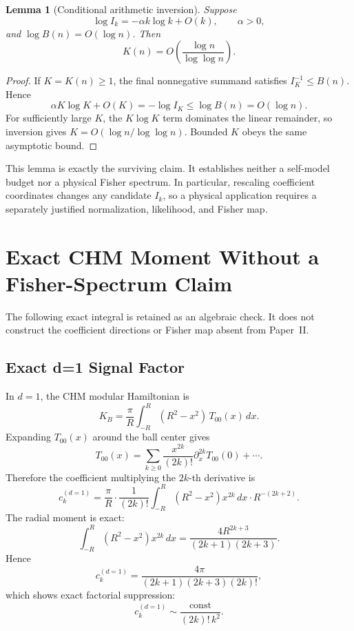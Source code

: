\documentclass[12pt]{article}
\newtheorem{lemma}[theorem]{Lemma}
\theoremstyle{definition}
\theoremstyle{remark}
\begin{document}
\begin{lemma}[Conditional arithmetic inversion]\label{lem:arithmetic-asymptotic}
Suppose
\[
\log I_k=-\alpha k\log k+O(k),
\qquad \alpha>0,
\]
and \(\log B(n)=O(\log n)\). Then
\[
K(n)=O\!\left(\frac{\log n}{\log\log n}\right).
\]
\end{lemma}

\begin{proof}
If \(K=K(n)\ge1\), the final nonnegative summand satisfies
\(I_K^{-1}\le B(n)\). Hence
\[
\alpha K\log K+O(K)=-\log I_K\le\log B(n)=O(\log n).
\]
For sufficiently large \(K\), the \(K\log K\) term dominates the
linear remainder, so inversion gives
\(K=O(\log n/\log\log n)\). Bounded \(K\) obeys the same asymptotic
bound.
\end{proof}

This lemma is exactly the surviving claim. It establishes neither a
self-model budget nor a physical Fisher spectrum. In particular,
rescaling coefficient coordinates changes any candidate \(I_k\), so a
physical application requires a separately justified normalization,
likelihood, and Fisher map.

\section{Exact CHM Moment Without a Fisher-Spectrum Claim}
\label{sec:5}

The following exact integral is retained as an algebraic check. It does
not construct the coefficient directions or Fisher map absent from
Paper~II.

\subsection{Exact d=1 Signal Factor}\label{subsec:5.2}

In \(d=1\), the CHM modular Hamiltonian is
\[
K_B
=
\frac{\pi}{R}\int_{-R}^{R}(R^2-x^2)\,T_{00}(x)\,dx.
\]
Expanding \(T_{00}(x)\) around the ball center gives
\[
T_{00}(x)
=
\sum_{k\ge 0}\frac{x^{2k}}{(2k)!}\partial_x^{2k}T_{00}(0)+\cdots.
\]
Therefore the coefficient multiplying the \(2k\)-th derivative is
\[
c_k^{(d=1)}
=
\frac{\pi}{R}\cdot\frac{1}{(2k)!}
\int_{-R}^{R}(R^2-x^2)x^{2k}\,dx\cdot R^{-(2k+2)}.
\]
The radial moment is exact:
\[
\int_{-R}^{R}(R^2-x^2)x^{2k}\,dx
=
\frac{4R^{2k+3}}{(2k+1)(2k+3)}.
\]
Hence
\[
c_k^{(d=1)}
=
\frac{4\pi}{(2k+1)(2k+3)(2k)!},
\]
which shows exact factorial suppression:
\[
c_k^{(d=1)}
\sim
\frac{\mathrm{const}}{(2k)!\,k^2}.
\]
\end{document}
